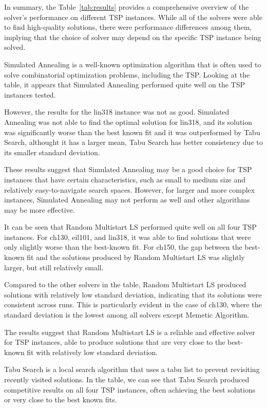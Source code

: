 \documentclass[conference]{IEEEtran}
\begin{document}
In summary, the Table~\ref{tab:results} provides a comprehensive overview of the solver's performance on different TSP instances. While all of the solvers were able to find high-quality solutions, there were performance differences among them, implying that the choice of solver may depend on the specific TSP instance being solved.

Simulated Annealing is a well-known optimization algorithm that is often used to solve combinatorial optimization problems, including the TSP. Looking at the table, it appears that Simulated Annealing performed quite well on the TSP instances tested.

However, the results for the lin318 instance was not as good. Simulated Annealing was not able to find the optimal solution for lin318, and its solution was significantly worse than the best known fit and it was outperformed by Tabu Search, althought it has a larger mean, Tabu Search has better consistency due to its smaller standard deviation.

These results suggest that Simulated Annealing may be a good choice for TSP instances that have certain characteristics, such as small to medium size and relatively easy-to-navigate search spaces. However, for larger and more complex instances, Simulated Annealing may not perform as well and other algorithms may be more effective.

It can be seen that Random Multistart LS performed quite well on all four TSP instances. For ch130, eil101, and lin318, it was able to find solutions that were only slightly worse than the best-known fit. For ch150, the gap between the best-known fit and the solutions produced by Random Multistart LS was slightly larger, but still relatively small.

Compared to the other solvers in the table, Random Multistart LS produced solutions with relatively low standard deviation, indicating that its solutions were consistent across runs. This is particularly evident in the case of ch130, where the standard deviation is the lowest among all solvers except Memetic Algorithm.

The results suggest that Random Multistart LS is a reliable and effective solver for TSP instances, able to produce solutions that are very close to the best-known fit with relatively low standard deviation.

Tabu Search is a local search algorithm that uses a tabu list to prevent revisiting recently visited solutions. In the table, we can see that Tabu Search produced competitive results on all four TSP instances, often achieving the best solutions or very close to the best known fits. 
\end{document}
